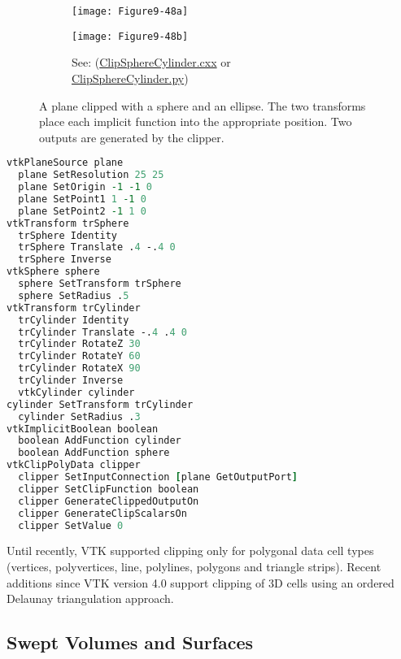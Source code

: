 \begin{figure}[htb]
    \centering
	\begin{subfigure}[h]{0.96\linewidth}
		\texttt{[image: Figure9-48a]}
		\captionsetup{justification=centering}
		\caption*{}
		\label{fig:Figure9-48a}
	\end{subfigure}
	\hfill
	\begin{subfigure}[h]{0.48\linewidth}
		\texttt{[image: Figure9-48b]}
		\captionsetup{justification=centering}
		\caption*{See: (\href{https://lorensen.github.io/VTKExamples/site/Cxx/VisualizationAlgorithms/ClipSphereCylinder/}{ClipSphereCylinder.cxx} or \href{https://lorensen.github.io/VTKExamples/site/Python/VisualizationAlgorithms/ClipSphereCylinder/}{ClipSphereCylinder.py})}
		\label{fig:Figure9-48b}
	\end{subfigure}
	\caption{A plane clipped with a sphere and an ellipse. The two transforms place each implicit function into the appropriate position. Two outputs are generated by the clipper.}\label{fig:Figure9-48}
\end{figure}

\begin{lstlisting}[language=TCL, caption={Clipping a plane with a sphere and ellipse.}]
vtkPlaneSource plane
  plane SetResolution 25 25
  plane SetOrigin -1 -1 0
  plane SetPoint1 1 -1 0
  plane SetPoint2 -1 1 0
vtkTransform trSphere
  trSphere Identity
  trSphere Translate .4 -.4 0
  trSphere Inverse
vtkSphere sphere
  sphere SetTransform trSphere
  sphere SetRadius .5
vtkTransform trCylinder
  trCylinder Identity
  trCylinder Translate -.4 .4 0
  trCylinder RotateZ 30
  trCylinder RotateY 60
  trCylinder RotateX 90
  trCylinder Inverse
  vtkCylinder cylinder
cylinder SetTransform trCylinder
  cylinder SetRadius .3
vtkImplicitBoolean boolean
  boolean AddFunction cylinder
  boolean AddFunction sphere
vtkClipPolyData clipper
  clipper SetInputConnection [plane GetOutputPort]
  clipper SetClipFunction boolean
  clipper GenerateClippedOutputOn
  clipper GenerateClipScalarsOn
  clipper SetValue 0
\end{lstlisting}

Until recently, VTK supported clipping only for polygonal data cell types (vertices, polyvertices, line, polylines, polygons and triangle strips). Recent additions since VTK version 4.0 support clipping of 3D cells using an ordered Delaunay triangulation approach.

\subsection{Swept Volumes and Surfaces}

